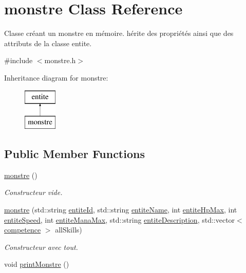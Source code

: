 \hypertarget{classmonstre}{}\section{monstre Class Reference}
\label{classmonstre}


Classe créant un monstre en mémoire. hérite des propriétés ainsi que des attributs de la classe entite.  




{\ttfamily \#include $<$monstre.\+h$>$}

Inheritance diagram for monstre\+:\begin{figure}[H]
\begin{center}
\leavevmode
\includegraphics[height=2.000000cm]{classmonstre}
\end{center}
\end{figure}
\subsection*{Public Member Functions}
\begin{DoxyCompactItemize}
\item 
\hyperlink{classmonstre_a718cb1c5f9297f00e42e6b884ca85d6d}{monstre} ()
\begin{DoxyCompactList}\small\item\em Constructeur vide. \end{DoxyCompactList}\item 
\hyperlink{classmonstre_a863d9f9a553a2e3a49d16182dd004da8}{monstre} (std\+::string \hyperlink{classentite_a904e8783de9fe2fc4306bf6b7822d025}{entite\+Id}, std\+::string \hyperlink{classentite_abe631a515b1cd0866dcfb078c4ceb07a}{entite\+Name}, int \hyperlink{classentite_a754557f56c1c1fcbcbd40eec68b60f65}{entite\+Hp\+Max}, int \hyperlink{classentite_ad9df70a9bb07f07b3ebf520941c3a35f}{entite\+Speed}, int \hyperlink{classentite_a696167d32c27b3b2a2fa6b473a888b18}{entite\+Mana\+Max}, std\+::string \hyperlink{classentite_a6fab1d9a04ade2cb97ec0904b12c82c9}{entite\+Description}, std\+::vector$<$ \hyperlink{classcompetence}{competence} $>$ all\+Skills)
\begin{DoxyCompactList}\small\item\em Constructeur avec tout. \end{DoxyCompactList}\item 
void \hyperlink{classmonstre_aeb60395664bbca7846e037b058b5c716}{print\+Monstre} ()
\end{DoxyCompactItemize}
